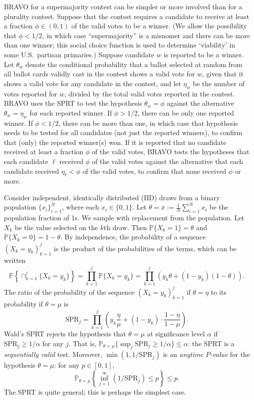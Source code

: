 \documentclass[aoas]{imsart}
\newcommand{\SPR}{\ensuremath{\mathrm{SPR}}}
\renewcommand{\Pr}{\mathbb{P}}
\begin{document}
BRAVO for a supermajority contest can be simpler or more involved than for a plurality contest. 
Suppose that the contest requires a candidate to receive at least a fraction $\phi \in (0, 1)$ of the valid votes
to be a winner.
(We allow the possibility that $\phi < 1/2$, in which case ``supermajority'' is a misnomer and there can be more than one winner;
this social choice function is used to determine `viability' in some U.S.\ partisan primaries.)
Suppose candidate $w$ is reported to be a winner.
Let $\theta_w$ denote the conditional probability that a ballot selected
at random from all ballot cards validly cast in the contest shows a valid vote for $w$, given that it shows a valid 
vote for any candidate in the contest,
and let $\eta_w$ be the number of votes reported for $w$, divided by the total valid votes reported in the contest.
BRAVO uses the SPRT to test the hypothesis $\theta_w = \phi$ against the alternative $\theta_w = \eta_w$
for each reported winner. 
If $\phi > 1/2$, there can be only one reported winner. 
If $\phi < 1/2$, there can be more than one, in which case
that hypothesis needs to be tested for all candidates (not just the reported winners), to confirm that (only) the
reported winner(s) won.
If it is reported that no candidate received at least a fraction $\phi$ of the valid votes,  
BRAVO tests the hypotheses that each candidate $\ell$  received $\phi$ of the valid votes
against the alternative that each candidate received $\eta_\ell < \phi$ of the valid votes,
to confirm that none received $\phi$ or more.

Consider independent, identically distributed (IID) draws from a binary population $\{x_i\}_{i=1}^N$, 
where each $x_i \in \{0, 1\}$.
Let $\theta = \bar{x} := \frac{1}{N} \sum_{i=1}^N x_i$ be the population fraction of 1s.
We sample with replacement from the population.
Let $X_k$ be the value selected on the $k$th draw. 
Then $\Pr \{X_k = 1 \} = \theta$ and $\Pr \{X_k = 0 \} = 1-\theta$.
By independence, the probability of a sequence $(X_k=y_k)_{k=1}^j$ is the product of the probabilities of the terms,
which can be written 
\begin{equation}
\Pr \left \{ \cap_{k=1}^j \{X_k = y_k \} \right \}= \prod_{k=1}^j \Pr \{X_k = y_k\} = \prod_{k=1}^j \left ( y_k \theta + (1-y_k)(1-\theta) \right ).
\end{equation}
The ratio of the probability of the sequence $(X_k=y_k)_{k=1}^j$ if $\theta = \eta$ to its probability if $\theta = \mu$ is
\begin{equation}
  \SPR_j = \prod_{k=1}^j \left ( y_k \frac{\eta}{\mu} + (1-y_k) \cdot \frac{1-\eta}{1-\mu} \right ).
\end{equation}
Wald's SPRT rejects the hypothesis that $\theta = \mu$ at significance level $\alpha$ if
$\SPR_j \ge 1/\alpha$ for any $j$.
That is, $\Pr_{\theta = \mu} \{\sup_j \SPR_j \ge 1/\alpha \} \le \alpha$: the SPRT is a \emph{sequentially valid} test.
Moreover, $\min(1, 1/\SPR_j)$ is an \emph{anytime $P$-value} for the hypothesis $\theta = \mu$:
for any $p \in [0, 1]$, 
$$\Pr_{\theta = \mu}  \left \{\inf_{j=1}^\infty (1/\SPR_j) \le p \right \} \le p.$$
The SPRT is quite general; this is perhaps the simplest case.
\end{document}
